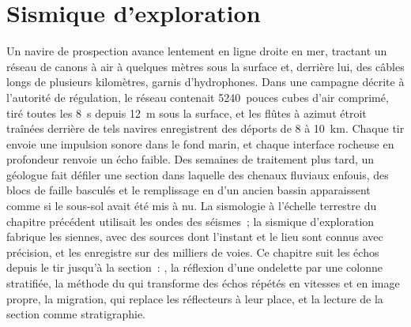 \chapter{Sismique d'exploration}\label{ch:b3:exploration-seismology}

Un navire de prospection avance lentement en ligne droite en mer, tractant un réseau de
canons à air à quelques mètres sous la surface et, derrière lui, des câbles longs de plusieurs
kilomètres, garnis d'hydrophones. Dans une campagne décrite à l'autorité de régulation,
le réseau contenait \num{5240}~pouces cubes d'air comprimé, tiré toutes les
\qty{8}{s} depuis \qty{12}{m} sous la surface, et les flûtes à azimut étroit
traînées derrière de tels navires enregistrent des déports de 8 à \qty{10}{km}.
Chaque tir envoie une impulsion sonore dans le fond marin, et chaque interface rocheuse
en profondeur renvoie un écho faible. Des semaines de traitement plus tard, un géologue fait défiler
une section dans laquelle des chenaux fluviaux enfouis, des blocs de faille basculés et
le remplissage en  d'un ancien bassin apparaissent comme si le sous-sol avait été mis à nu.
La sismologie à l'échelle terrestre du chapitre précédent utilisait les ondes
des séismes~; la sismique d'exploration fabrique les siennes, avec des sources dont l'instant et
le lieu sont connus avec précision, et les enregistre sur des milliers de voies. Ce
chapitre suit les échos depuis le tir jusqu'à la section~: ,
la réflexion d'une ondelette par une colonne stratifiée, la méthode du 
qui transforme des échos répétés en vitesses et en image propre, la migration, qui
replace les réflecteurs à leur place, et la lecture de la section comme
stratigraphie.

